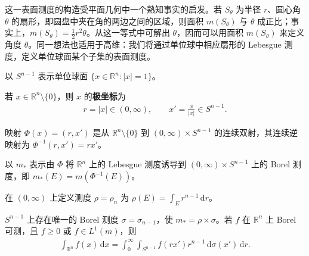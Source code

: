 \documentclass[../../main.tex]{subfiles}%
\begin{document}
这一表面测度的构造受平面几何中一个熟知事实的启发。若 $S_\theta$ 为半径 $r$、圆心角 $\theta$ 的扇形，即圆盘中夹在角的两边之间的区域，则面积 $m(S_\theta)$ 与 $\theta$ 成正比；事实上，$m(S_\theta)=\frac12r^2\theta$。从这一等式中可解出 $\theta$，因而可以用面积 $m(S_\theta)$ 来定义角度 $\theta$。同一想法也适用于高维：我们将通过单位球中相应扇形的 Lebesgue 测度，定义单位球面某个子集的表面测度。
\begin{definition}[单位球面]\label{definition:ch02-unit-sphere}
以 $S^{n-1}$ 表示单位球面 $\{x\in\mathbb{R}^n:|x|=1\}$。
\end{definition}
\begin{definition}[$n$ 维极坐标]\label{definition:ch02-n-dimensional-polar-coordinates}
若 $x\in\mathbb{R}^n\setminus\{0\}$，则 $x$ 的\textbf{极坐标}为
\begin{align*}
r=|x|\in(0,\infty),\qquad x'=\frac{x}{|x|}\in S^{n-1}.
\end{align*}
\end{definition}
\begin{proposition}\label{proposition:ch02-polar-map}
映射 $\Phi(x)=(r,x')$ 是从 $\mathbb{R}^n\setminus\{0\}$ 到 $(0,\infty)\times S^{n-1}$ 的连续双射，其连续逆映射为 $\Phi^{-1}(r,x')=rx'$。
\end{proposition}
\begin{definition}[极坐标诱导测度]\label{definition:ch02-polar-induced-measure}
以 $m_*$ 表示由 $\Phi$ 将 $\mathbb{R}^n$ 上的 Lebesgue 测度诱导到 $(0,\infty)\times S^{n-1}$ 上的 Borel 测度，即 $m_*(E)=m(\Phi^{-1}(E))$。
\end{definition}
\begin{definition}[径向测度]\label{definition:ch02-radial-measure}
在 $(0,\infty)$ 上定义测度 $\rho=\rho_n$ 为 $\rho(E)=\int_E r^{n-1}\,\mathrm{d}r$。
\end{definition}
\begin{theorem}\label{theorem:ch02-polar-integration}
$S^{n-1}$ 上存在唯一的 Borel 测度 $\sigma=\sigma_{n-1}$，使 $m_*=\rho\times\sigma$。若 $f$ 在 $\mathbb{R}^n$ 上 Borel 可测，且 $f\ge0$ 或 $f\in L^1(m)$，则
\begin{align}\label{align:ch02-polar-integration}
\int_{\mathbb{R}^n}f(x)\,\mathrm{d}x=\int_0^\infty\int_{S^{n-1}}f(rx')r^{n-1}\,\mathrm{d}\sigma(x')\,\mathrm{d}r.
\end{align}
\end{theorem}
\end{document}
